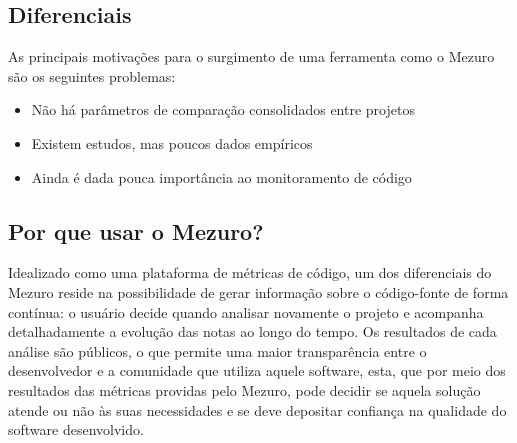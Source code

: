 \documentclass[12pt]{article}
\begin{document}
  \subsection{Diferenciais} \label{subsec:motivacao}
  As principais motivações para o surgimento de uma ferramenta como o Mezuro são os seguintes problemas:
  \begin{itemize}
      \item Não há parâmetros de comparação consolidados entre projetos
      \item Existem estudos, mas poucos dados empíricos
      \item Ainda é dada pouca importância ao monitoramento de código
  \end{itemize}
  \subsection{Por que usar o Mezuro?} \label{sec:projeto-mezuro}
  Idealizado como uma plataforma de métricas de código, um dos diferenciais do Mezuro reside na possibilidade de gerar informação sobre o código-fonte de forma contínua: o usuário decide quando analisar novamente o projeto e acompanha detalhadamente a evolução das notas ao longo do tempo. Os resultados de cada análise são públicos, o que permite uma maior transparência entre o desenvolvedor e a comunidade que utiliza aquele software, esta, que por meio dos resultados das métricas providas pelo Mezuro, pode decidir se aquela solução atende ou não às suas necessidades e se deve depositar confiança na qualidade do software desenvolvido.
\end{document}

